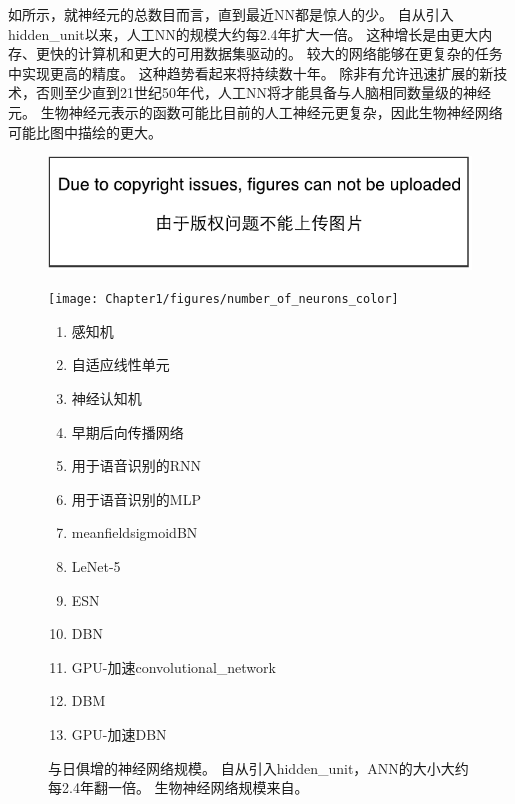 如所示，就神经元的总数目而言，直到最近\gls{NN}都是惊人的少。
自从引入\gls{hidden_unit}以来，人工\gls{NN}的规模大约每2.4年扩大一倍。
这种增长是由更大内存、更快的计算机和更大的可用数据集驱动的。
较大的网络能够在更复杂的任务中实现更高的精度。
这种趋势看起来将持续数十年。
除非有允许迅速扩展的新技术，否则至少直到21世纪50年代，人工\gls{NN}将才能具备与人脑相同数量级的神经元。
生物神经元表示的函数可能比目前的人工神经元更复杂，因此生物神经网络可能比图中描绘的更大。
\begin{figure}[!htb]
\ifOpenSource
\centerline{\includegraphics{figure.pdf}}
\else
\centerline{\texttt{[image: Chapter1/figures/number\_of\_neurons\_color]}}
\fi
\caption{与日俱增的神经网络规模。
自从引入\gls{hidden_unit}，\gls{ANN}的大小大约每2.4年翻一倍。
生物神经网络规模来自\citet{number_of_neurons}。
}
\label{fig:chap1_number_of_neurons_color}
{\tiny
\begin{enumerate}
  \itemsep-.1em
  \item %
    感知机~\citep{Rosenblatt-1958,Rosenblatt62}
  \item %
    自适应线性单元~\citep{Widrow60}
  \item %
    神经认知机~\citep{Fukushima80}
  \item %
    早期后向传播网络~\citep{Rumelhart86c}
  \item %
    用于语音识别的\gls{RNN}~\citep{Robinson+Fallside91}
  \item %
    用于语音识别的\gls{MLP}~\citep{Bengio91z}
  \item %
    \gls{meanfield}sigmoid\gls{BN}~\citep{Saul+96}
  \item %
    LeNet-5~\citep{LeCun98-small}
  \item %
    \gls{ESN}~\citep{Jaeger+Haas-2004}
  \item %
    \gls{DBN}~\citep{Hinton06}
  \item %
    GPU-加速\gls{convolutional_network}~\citep{chellapilla:inria-00112631}
  \item %
    \gls{DBM}~\citep{SalHinton09}
  \item %
    GPU-加速\gls{DBN}~\citep{RainaICML09}

\end{enumerate}}
\end{figure}
